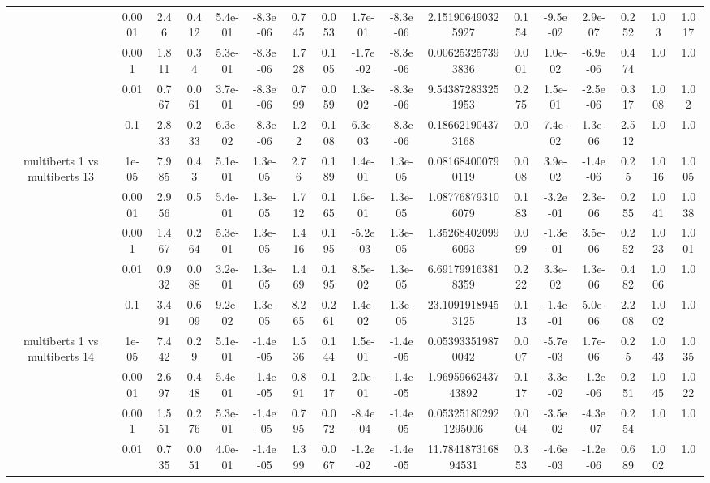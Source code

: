 \begin{tabular}{|c|c|c|c|c|c|c|c|c|c|c|c|c|c|c|c|c|}
 & 0.0001 & 2.46 & 0.412 & 5.4e-01 & -8.3e-06 & 0.745 & 0.053 & 1.7e-01 & -8.3e-06 & 2.151906490325927 & 0.154 & -9.5e-02 & 2.9e-07 & 0.252 & 1.03 & 1.017 \\
 & 0.001 & 1.811 & 0.34 & 5.3e-01 & -8.3e-06 & 1.728 & 0.105 & -1.7e-02 & -8.3e-06 & 0.006253257393836 & 0.001 & 1.0e-02 & -6.9e-06 & 0.474 & 1.0 & 1.0 \\
 & 0.01 & 0.767 & 0.061 & 3.7e-01 & -8.3e-06 & 0.799 & 0.059 & 1.3e-02 & -8.3e-06 & 9.543872833251953 & 0.275 & 1.5e-01 & -2.5e-06 & 0.317 & 1.008 & 1.02 \\
 & 0.1 & 2.833 & 0.233 & 6.3e-02 & -8.3e-06 & 1.22 & 0.108 & 6.3e-03 & -8.3e-06 & 0.186621904373168 & 0.0 & 7.4e-02 & 1.3e-06 & 2.512 & 1.0 & 1.0 \\
\hline
\multirow{5}{*}{multiberts 1 vs multiberts 13} & 1e-05 & 7.985 & 0.43 & 5.1e-01 & 1.3e-05 & 2.76 & 0.189 & 1.4e-01 & 1.3e-05 & 0.081684000790119 & 0.008 & 3.9e-02 & -1.4e-06 & 0.25 & 1.016 & 1.005 \\
 & 0.0001 & 2.956 & 0.5 & 5.4e-01 & 1.3e-05 & 1.712 & 0.165 & 1.6e-01 & 1.3e-05 & 1.087768793106079 & 0.183 & -3.2e-01 & 2.3e-06 & 0.255 & 1.041 & 1.038 \\
 & 0.001 & 1.467 & 0.264 & 5.3e-01 & 1.3e-05 & 1.416 & 0.195 & -5.2e-03 & 1.3e-05 & 1.352684020996093 & 0.099 & -1.3e-01 & 3.5e-06 & 0.252 & 1.023 & 1.001 \\
 & 0.01 & 0.932 & 0.088 & 3.2e-01 & 1.3e-05 & 1.469 & 0.195 & 8.5e-02 & 1.3e-05 & 6.691799163818359 & 0.222 & 3.3e-02 & 1.3e-06 & 0.482 & 1.006 & 1.0 \\
 & 0.1 & 3.491 & 0.609 & 9.2e-02 & 1.3e-05 & 8.265 & 0.261 & 1.4e-02 & 1.3e-05 & 23.10919189453125 & 0.113 & -1.4e-01 & 5.0e-06 & 2.208 & 1.002 & 1.0 \\
\hline
\multirow{5}{*}{multiberts 1 vs multiberts 14} & 1e-05 & 7.442 & 0.29 & 5.1e-01 & -1.4e-05 & 1.536 & 0.144 & 1.5e-01 & -1.4e-05 & 0.053933519870042 & 0.007 & -5.7e-03 & 1.7e-06 & 0.25 & 1.043 & 1.035 \\
 & 0.0001 & 2.697 & 0.448 & 5.4e-01 & -1.4e-05 & 0.891 & 0.117 & 2.0e-01 & -1.4e-05 & 1.9695966243743892 & 0.117 & -3.3e-02 & -1.2e-06 & 0.251 & 1.045 & 1.022 \\
 & 0.001 & 1.551 & 0.276 & 5.3e-01 & -1.4e-05 & 0.795 & 0.072 & -8.4e-04 & -1.4e-05 & 0.053251802921295006 & 0.004 & -3.5e-02 & -4.3e-07 & 0.254 & 1.0 & 1.0 \\
 & 0.01 & 0.735 & 0.051 & 4.0e-01 & -1.4e-05 & 1.399 & 0.067 & -1.2e-02 & -1.4e-05 & 11.784187316894531 & 0.353 & -4.6e-03 & -1.2e-06 & 0.689 & 1.002 & 1.0 \\

\end{tabular}
